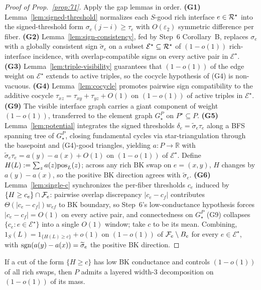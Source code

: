 \begin{proof}[Proof of Prop.~\ref{prop:71}]
Apply the gap lemmas in order.
\textbf{(G1)} Lemma~\ref{lem:signed-threshold} normalizes each
$S$-good rich interface $e\in\mathcal{R}^\star$ into the signed-threshold
form $\sigma_e(j-i)\ge\tau_e$ with $O(\varepsilon_2)$ symmetric
difference per fiber.
\textbf{(G2)} Lemma~\ref{lem:sign-consistency}, fed by Step~6
Corollary~B, replaces $\sigma_e$ with a globally consistent sign
$\widetilde\sigma_e$ on a subset
$\mathcal{E}^\star\subseteq\mathcal{R}^\star$ of $(1-o(1))$ rich-interface
incidence, with overlap-compatible signs on every active pair in
$\mathcal{E}^\star$.
\textbf{(G3)} Lemma~\ref{lem:triple-visibility} guarantees that
$(1-o(1))$ of the edge weight on $\mathcal{E}^\star$ extends to
active triples, so the cocycle hypothesis of (G4) is non-vacuous.
\textbf{(G4)} Lemma~\ref{lem:cocycle} promotes pairwise sign
compatibility to the additive cocycle
$\tau_{xz}=\tau_{xy}+\tau_{yz}+O(1)$ on $(1-o(1))$ of active triples
in $\mathcal{E}^\star$.
\textbf{(G9)} The visible interface graph carries a giant component
of weight $(1-o(1))$, transferred to the element graph $G^P_\star$
on $P^\star\subseteq P$.
\textbf{(G5)} Lemma~\ref{lem:potential} integrates the signed
thresholds $\delta_e=\widetilde\sigma_e\tau_e$ along a BFS spanning
tree of $G^P_\star$, closing fundamental cycles via star-triangulation
through the basepoint and (G4)-good triangles, yielding
$a\colon P\to\mathbb{R}$ with
$\widetilde\sigma_e\tau_e=a(y)-a(x)+O(1)$ on $(1-o(1))$ of
$\mathcal{E}^\star$.  Define $H(L):=\sum_z a(z)\mathrm{pos}_L(z)$;
across any rich BK swap on $e=(x,y)$, $H$ changes by $a(y)-a(x)$,
so the positive BK direction agrees with $\widetilde\sigma_e$.
\textbf{(G6)} Lemma~\ref{lem:single-c} synchronizes the per-fiber
thresholds $c_e$ induced by $\{H\ge c_e\}\cap\mathcal{F}_{e}$: pairwise
overlap discrepancy $|c_e-c_f|$ contributes
$\Theta(|c_e-c_f|)w_{ef}$ to BK boundary, so Step~6's
low-conductance hypothesis forces $|c_e-c_f|=O(1)$ on every active
pair, and connectedness on $G^P_\star$ (G9) collapses
$\{c_e:e\in\mathcal{E}^\star\}$ into a single $O(1)$ window;
take $c$ to be its mean.
Combining,
$1_S(L)=1_{\{H(L)\ge c\}}+o(1)$ on
$(1-o(1))$ of $\mathcal{F}_{e}\setminus B_e$ for every
$e\in\mathcal{E}^\star$, with $\operatorname{sgn}(a(y)-a(x))=\widetilde\sigma_e$
the positive BK direction.
\end{proof}

\begin{proposition}\label{prop:72}
If a cut of the form $\{H\ge c\}$ has low BK conductance and controls
$(1-o(1))$ of all rich swaps, then $P$ admits a layered width-3
decomposition on $(1-o(1))$ of its mass.
\end{proposition}


